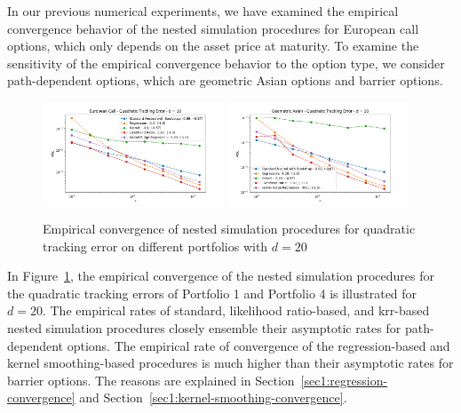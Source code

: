 In our previous numerical experiments, we have examined the empirical convergence behavior of the nested simulation procedures for European call options, which only depends on the asset price at maturity.
To examine the sensitivity of the empirical convergence behavior to the option type, we consider path-dependent options, which are geometric Asian options and barrier options.

\begin{figure}[ht!] 
    \centering
    \includegraphics[width=0.48\textwidth]{./project1/figures/figure6a.png}
    \includegraphics[width=0.48\textwidth]{./project1/figures/figure6b.png}
    \caption{Empirical convergence of nested simulation procedures for quadratic tracking error on different portfolios with $d=20$}
\label{fig1:1x03} 
\end{figure}

In Figure~\ref{fig1:1x03}, the empirical convergence of the nested simulation procedures for the quadratic tracking errors of Portfolio 1 and Portfolio 4 is illustrated for $d = 20$.
The empirical rates of standard, likelihood ratio-based, and \gls{krr}-based nested simulation procedures closely ensemble their asymptotic rates for path-dependent options.
The empirical rate of convergence of the regression-based and kernel smoothing-based procedures is much higher than their asymptotic rates for barrier options. 
The reasons are explained in Section~\ref{sec1:regression-convergence} and Section~\ref{sec1:kernel-smoothing-convergence}.

